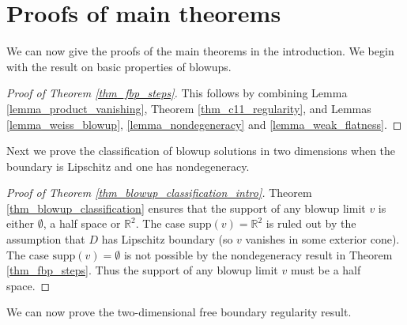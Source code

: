\documentclass[11pt,a4paper]{amsart}
\theoremstyle{definition}
\numberwithin{equation}{section}
\newcommand{\mR}{\mathbb{R}}                    %
\newcommand{\supp}{\mathrm{supp}}
\begin{document}
\section{Proofs of main theorems} \label{sec_fb_regularity}



We can now give the proofs of the main theorems in the introduction. We begin with the result on basic properties of blowups.

\begin{proof}[Proof of Theorem \ref{thm_fbp_steps}]
This follows by combining Lemma \ref{lemma_product_vanishing}, Theorem \ref{thm_c11_regularity}, and Lemmas \ref{lemma_weiss_blowup}, \ref{lemma_nondegeneracy} and \ref{lemma_weak_flatness}.
\end{proof}

Next we prove the classification of blowup solutions in two dimensions when the boundary is Lipschitz and one has nondegeneracy.



\begin{proof}[Proof of Theorem \ref{thm_blowup_classification_intro}]
Theorem \ref{thm_blowup_classification} ensures that the support of any blowup limit $v$ is either $\emptyset$, a half space or $\mR^2$. The case $\supp(v) = \mR^2$ is ruled out by the assumption that $D$ has Lipschitz boundary (so $v$ vanishes in some exterior cone). The case $\supp(v) = \emptyset$ is not possible  by the nondegeneracy result in Theorem \ref{thm_fbp_steps}. Thus the support of any blowup limit $v$ must be a half space.
\end{proof}

We can now prove the two-dimensional free boundary regularity result.
\end{document}
